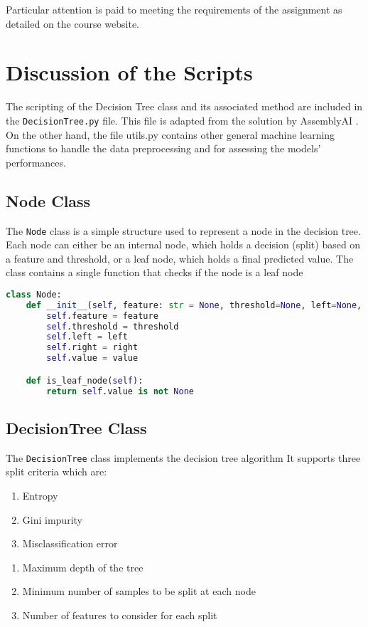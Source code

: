 \documentclass{article}
\begin{document}
Particular attention is paid to meeting the requirements of the assignment as detailed on the course website.

\section{Discussion of the Scripts}
The scripting of the Decision Tree class and its associated method are included in the \texttt{DecisionTree.py} file. This file is adapted from the solution by AssemblyAI \cite{assemblyai}. On the other hand, the file utils.py contains other general machine learning functions to handle the data preprocessing and for assessing the models' performances.

\subsection{Node Class}
The \texttt{Node} class is a simple structure used to represent a node in the decision tree. Each node can either be an internal node, which holds a decision (split) based on a feature and threshold, or a leaf node, which holds a final predicted value. The class contains a single function that checks if the node is a leaf node

\begin{lstlisting}[language=Python, caption=Node Class]
class Node:
    def __init__(self, feature: str = None, threshold=None, left=None, right=None, *, value=None):
        self.feature = feature
        self.threshold = threshold
        self.left = left
        self.right = right
        self.value = value

    def is_leaf_node(self):
        return self.value is not None
\end{lstlisting}

\subsection{DecisionTree Class}
The \texttt{DecisionTree} class implements the decision tree algorithm It supports three split criteria which are:
\begin{enumerate}
    \item Entropy
    \item Gini impurity
    \item Misclassification error
\end{enumerate}

\begin{enumerate}
    \item Maximum depth of the tree
    \item Minimum number of samples to be split at each node
    \item Number of features to consider for each split
\end{enumerate}
\end{document}
